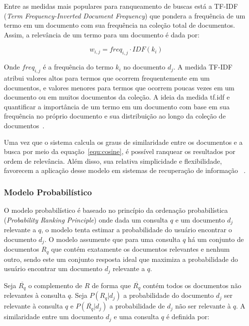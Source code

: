 Entre as medidas mais populares para ranqueamento de buscas está a TF-IDF (\textit{Term Frequency-Inverted Document Frequency}) que pondera a frequência de um termo em um documento com sua frequência na coleção total de documentos. Assim, a relevância de um termo para um documento é dada por:

\begin{equation}
	w_{i,j} = freq_{i,j} \cdot IDF(k_i)
\end{equation}



Onde $freq_{i,j}$ é a frequência do termo $k_i$ no documento $d_j$. A medida TF-IDF atribui valores altos para termos que ocorrem frequentemente em um documentos, e valores menores para termos que ocorrem poucas vezes em um documento ou em muitos documentos da coleção. A ideia da medida tf.idf e quantificar a importância de um termo em um documento com base em sua frequência no próprio documento e sua distribuição ao longo da coleção de documentos~\cite{Croft2009,Salton1988,Shamsinejadbabki2012,Salton:1994}.


Uma vez que o sistema calcula os graus de similaridade entre os documentos e a busca por meio da equação~\ref{equ:cosine}, é possível ranquear os resultados por ordem de relevância. Além disso, sua relativa simplicidade e flexibilidade, favorecem a aplicação desse modelo em sistemas de recuperação de informação
~\cite{Tan2005,Croft2009,Manning2008}.



\subsubsection{Modelo Probabilístico}

 
O modelo probabilístico é baseado no princípio da ordenação probabilística (\textit{Probability Ranking Principle}) onde dada um consulta $q$ e um documento $d_j$ relevante a $q$, o modelo tenta estimar a probabilidade do usuário encontrar o documento $d_j$. O modelo assumente que para uma consulta $q$ há um conjunto de documentos $R_q$ que contém exatamente os documentos relevantes e nenhum outro, sendo este um conjunto resposta ideal que maximiza a probabilidade do usuário encontrar um documento $d_j$ relevante a $q$. 

Seja $\overline{R_q}$ o complemento de $R$ de forma que $\overline{R_q}$ contém todos os documentos não relevantes à consulta $q$. Seja $P(R_q|d_j)$ a probabilidade do documento $d_j$ ser relevante à consulta $q$ e $P(\overline{R_q}|d_j)$ a probabilidade de $d_j$ não ser relevante à $q$. A similaridade entre um documento $d_j$ e uma consulta $q$ é definida por:






